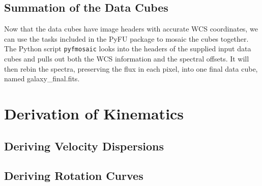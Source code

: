 \documentclass[12pt]{report}
\begin{document}
\section{Summation of the Data Cubes}

Now that the data cubes have image headers with accurate WCS coordinates, we can use the tasks included in the PyFU package to mosaic the cubes together. The Python script \texttt{pyfmosaic} looks into the headers of the supplied input data cubes and pulls out both the WCS information and the spectral offsets. It will then rebin the spectra, preserving the flux in each pixel, into one final data cube, named galaxy\_final.fits.

\chapter{Derivation of Kinematics}

\section{Deriving Velocity Dispersions}
\section{Deriving Rotation Curves}

\end{document}
